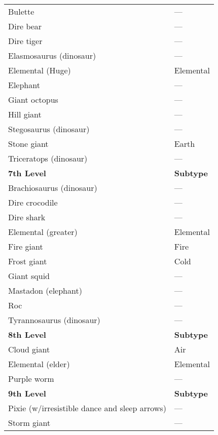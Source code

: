 \begin{tabular}{ll}
Bulette                                       & ---                \\
Dire bear                                     & ---                \\
Dire tiger                                    & ---                \\
Elasmosaurus (dinosaur)                       & ---                \\
Elemental (Huge)                              & Elemental        \\
Elephant                                      & ---                \\
Giant octopus                                 & ---                \\
Hill giant                                    & ---                \\
Stegosaurus (dinosaur)                        & ---                \\
Stone giant                                   & Earth            \\
Triceratops (dinosaur)                        & ---                \\
\textbf{7th Level}                            & \textbf{Subtype} \\
Brachiosaurus (dinosaur)                      & ---                \\
Dire crocodile                                & ---                \\
Dire shark                                    & ---                \\
Elemental (greater)                           & Elemental        \\
Fire giant                                    & Fire             \\
Frost giant                                   & Cold             \\
Giant squid                                   & ---                \\
Mastadon (elephant)                           & ---                \\
Roc                                           & ---                \\
Tyrannosaurus (dinosaur)                      & ---                \\
\textbf{8th Level}                            & \textbf{Subtype} \\
Cloud giant                                   & Air              \\
Elemental (elder)                             & Elemental        \\
Purple worm                                   & ---                \\
\textbf{9th Level}                            & \textbf{Subtype} \\
Pixie (w/irresistible dance and sleep arrows) & ---                \\
Storm giant                                   & ---               
\end{tabular}

